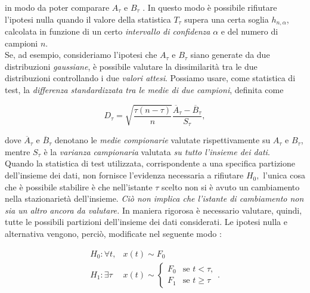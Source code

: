 			in modo da poter comparare $ A_\tau $ e $ B_\tau $ \cite{alippi2014intelligence}. In questo modo \`e possibile rifiutare l'ipotesi nulla quando il valore della statistica $ T_\tau $ supera una certa soglia $ h_{n,\alpha} $, calcolata in funzione di un certo \textit{intervallo di confidenza} $ \alpha $ e del numero di campioni $ n $.\\
			Se, ad esempio, consideriamo l'ipotesi che $
                        A_\tau $
                        e $ B_\tau $ siano generate da due
                        distribuzioni \textit{gaussiane}, \`e
                        possibile valutare la dissimilarit\`a tra le
                        due distribuzioni controllando i due
                        \textit{valori attesi}. Possiamo usare, come
                        statistica di test, la \textit{differenza
                          standardizzata tra le medie di due
                          campioni}, definita come
			
			\[ D_\tau = \sqrt{\frac{\tau(n-\tau)}{n}}
                        \frac{\overline{A}_\tau-\overline{B}_\tau}{S_\tau}, \]
			
			dove $ \overline{A}_\tau $ e $ \overline{B}_\tau $ denotano le \textit{medie compionarie} valutate rispettivamente su $ A_\tau $ e $ B_\tau $, mentre $ S_\tau $ \`e la \textit{varianza campionaria} valutata \textit{su tutto l'insieme dei dati}.\\
			
			Quando la statistica di test utilizzata,
                        corrispondente a una specifica partizione
                        dell'insieme dei dati, non fornisce l'evidenza
                        necessaria a rifiutare $ H_0, $ l'unica cosa
                        che \`e possibile stabilire \`e che
                        nell'istante $ \tau $ scelto non si \`e avuto
                        un cambiamento nella stazionariet\`a
                        dell'insieme. \textit{Ci\`o non implica che
                          l'istante di cambiamento non sia un altro
                          ancora da valutare.} In maniera rigorosa \`e
                        necessario valutare, quindi, tutte le
                        possibili partizioni dell'insieme dei dati
                        considerati. Le ipotesi nulla e alternativa
                        vengono, perci\`o, modificate nel seguente
                        modo \cite{ross2011nonparametric}:
			
			
			\begin{eqnarray}
                          H_0 : \forall t, & x(t) \sim F_0 \\
                          H_1 : \exists \tau & x(t) \sim 
                                               \begin{cases}
                                                 F_{0} & \text{se } t < \tau, \\
                                                 F_{1} & \text{se } t
                                                 \geq \tau
                                               \end{cases}.
			\end{eqnarray}
			
